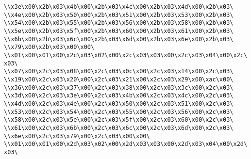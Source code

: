 \verb|\\x3e\x00\x2b\x03\x4b\x00\x2b\x03\x4c\x00\x2b\x03\x4d\x00\x2b\x03\|\newline
\verb|\\x4e\x00\x2b\x03\x50\x00\x2b\x03\x51\x00\x2b\x03\x53\x00\x2b\x03\|\newline
\verb|\\x54\x00\x2b\x03\x55\x00\x2b\x03\x56\x00\x2b\x03\x58\x00\x2b\x03\|\newline
\verb|\\x5e\x00\x2b\x03\x5f\x00\x2b\x03\x60\x00\x2b\x03\x61\x00\x2b\x03\|\newline
\verb|\\x6b\x00\x2b\x03\x6c\x00\x2b\x03\x6d\x00\x2b\x03\x6e\x00\x2b\x03\|\newline
\verb|\\x79\x00\x2b\x03\x00\x00\|\newline
\verb|\\x01\x00\x01\x00\x2c\x03\x02\x00\x2c\x03\x03\x00\x2c\x03\x04\x00\x2c\x03\|\newline
\verb|\\x07\x00\x2c\x03\x08\x00\x2c\x03\x0c\x00\x2c\x03\x14\x00\x2c\x03\|\newline
\verb|\\x19\x00\x2c\x03\x20\x00\x2c\x03\x21\x00\x2c\x03\x29\x00\xac\x00\|\newline
\verb|\\x36\x00\x2c\x03\x37\x00\x2c\x03\x38\x00\x2c\x03\x3c\x00\x2c\x03\|\newline
\verb|\\x3d\x00\x2c\x03\x3e\x00\x2c\x03\x4b\x00\x2c\x03\x4c\x00\x2c\x03\|\newline
\verb|\\x4d\x00\x2c\x03\x4e\x00\x2c\x03\x50\x00\x2c\x03\x51\x00\x2c\x03\|\newline
\verb|\\x53\x00\x2c\x03\x54\x00\x2c\x03\x55\x00\x2c\x03\x56\x00\x2c\x03\|\newline
\verb|\\x58\x00\x2c\x03\x5e\x00\x2c\x03\x5f\x00\x2c\x03\x60\x00\x2c\x03\|\newline
\verb|\\x61\x00\x2c\x03\x6b\x00\x2c\x03\x6c\x00\x2c\x03\x6d\x00\x2c\x03\|\newline
\verb|\\x6e\x00\x2c\x03\x79\x00\x2c\x03\x00\x00\|\newline
\verb|\\x01\x00\x01\x00\x2d\x03\x02\x00\x2d\x03\x03\x00\x2d\x03\x04\x00\x2d\x03\|\newline
